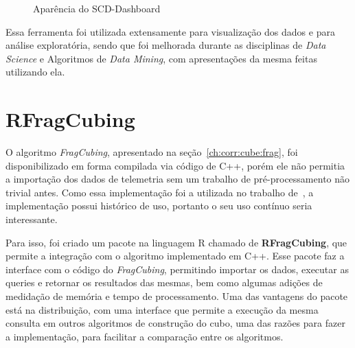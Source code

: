 \begin{figure}[ht]
	\caption{Aparência do SCD-Dashboard}\label{fig:scddashboard}
	\vspace{6mm}
	\begin{center}
	\end{center}
	\vspace{4mm}
	\legenda{}
\end{figure}

Essa ferramenta foi utilizada extensamente para visualização dos dados e para análise exploratória, sendo que foi melhorada durante as disciplinas de \textit{Data Science} e Algoritmos de \textit{Data Mining}, com apresentações da mesma feitas utilizando ela.

\section{RFragCubing}\label{ch:impl:rfrag}

{\color{cerulean}
O algoritmo \textit{FragCubing}, apresentado na seção~\ref{ch:corr:cube:frag}, foi disponibilizado em forma compilada via código de C++, porém ele não permitia a importação dos dados de telemetria sem um trabalho de pré-processamento não trivial antes.
Como essa implementação foi a utilizada no trabalho de~\cite{silva:2015:abordagensParaCubo}, a implementação possui histórico de uso, portanto o seu uso contínuo seria interessante.
}

Para isso, foi criado um pacote na linguagem R chamado de \textbf{RFragCubing}, que permite a integração com o algoritmo implementado em C++.
Esse pacote faz a interface com o código do \textit{FragCubing}, permitindo importar os dados, executar as queries e retornar os resultados das mesmas, bem como algumas adições de medidação de memória e tempo de processamento.
Uma das vantagens do pacote está na distribuição, com uma interface que permite a execução da mesma consulta em outros algoritmos de construção do cubo, uma das razões para fazer a implementação, para facilitar a comparação entre os algoritmos.

